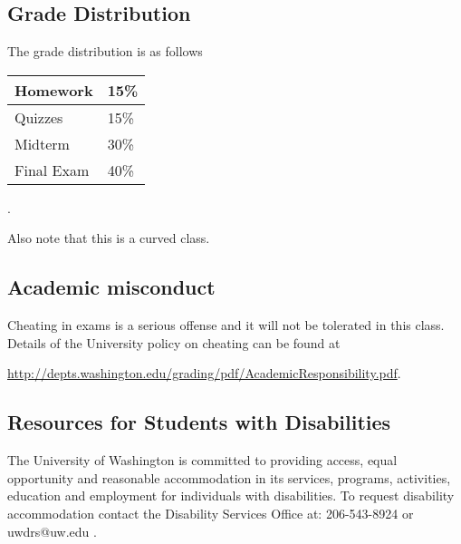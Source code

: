 \documentclass[11pt]{article}
\begin{document}
\vspace{1mm}

\subsection*{Grade Distribution}
 \indent The grade distribution is as follows\\
\hspace*{40mm}
\begin{center}
\begin{tabular}{| l| l |}
  \hline
Homework & 15\% \\
\hline
Quizzes & 15\%\\
\hline
Midterm  & 30\% \\
\hline
Final Exam  & 40\%\\
\hline
\end{tabular}.
\end{center}
Also note that this is a curved class.\\
\vspace{1mm}

\subsection*{Academic misconduct}
 Cheating in exams is a serious offense and it will not be tolerated in this class. Details of the University policy on cheating can be found at \begin{center}
 \url{http://depts.washington.edu/grading/pdf/AcademicResponsibility.pdf}.
 \end{center}
\vspace{1mm}
\subsection*{Resources for Students with Disabilities}
The University of Washington is committed to providing access, equal opportunity and reasonable accommodation in its services, programs, activities, education and employment for individuals with disabilities. To request disability accommodation contact the Disability Services Office at: 206-543-8924 or uwdrs@uw.edu .
\end{document}
